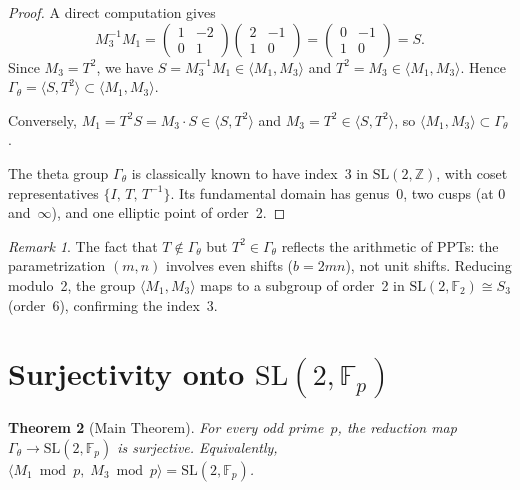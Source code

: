 \documentclass[12pt]{amsart}
\newtheorem{theorem}{Theorem}[section]
\theoremstyle{definition}
\theoremstyle{remark}
\newtheorem{remark}[theorem]{Remark}
\newcommand{\SL}{\mathrm{SL}}
\newcommand{\Fp}{\mathbb{F}_p}
\newcommand{\Z}{\mathbb{Z}}
\begin{document}
\begin{proof}
A direct computation gives
\[
M_3^{-1} M_1
= \begin{pmatrix}1&-2\\0&1\end{pmatrix}
  \begin{pmatrix}2&-1\\1&0\end{pmatrix}
= \begin{pmatrix}0&-1\\1&0\end{pmatrix}
= S.
\]
Since $M_3 = T^2$, we have $S = M_3^{-1}M_1 \in \langle M_1,M_3\rangle$
and $T^2 = M_3 \in \langle M_1,M_3\rangle$.  Hence
$\Gamma_\theta = \langle S,T^2\rangle \subset \langle M_1,M_3\rangle$.

Conversely, $M_1 = T^2 S = M_3 \cdot S \in \langle S, T^2\rangle$ and
$M_3 = T^2 \in \langle S,T^2\rangle$, so
$\langle M_1,M_3\rangle \subset \Gamma_\theta$.

The theta group $\Gamma_\theta$ is classically known to have index~3 in
$\SL(2,\Z)$, with coset representatives $\{I,\, T,\, T^{-1}\}$.  Its
fundamental domain has genus~0, two cusps (at $0$ and~$\infty$), and one
elliptic point of order~2.
\end{proof}

\begin{remark}
The fact that $T \notin \Gamma_\theta$ but $T^2 \in \Gamma_\theta$ reflects
the arithmetic of PPTs: the parametrization $(m,n)$ involves even shifts
($b = 2mn$), not unit shifts.  Reducing modulo~2, the group
$\langle M_1, M_3\rangle$ maps to a subgroup of order~2 in
$\SL(2,\mathbb{F}_2) \cong S_3$ (order~6), confirming the index~3.
\end{remark}

\section{Surjectivity onto $\SL(2,\Fp)$}\label{sec:surject}

\begin{theorem}[Main Theorem]\label{thm:main}
For every odd prime~$p$, the reduction map
$\Gamma_\theta \to \SL(2,\Fp)$ is surjective.
Equivalently, $\langle M_1 \bmod p,\; M_3 \bmod p \rangle = \SL(2,\Fp)$.
\end{theorem}
\end{document}

